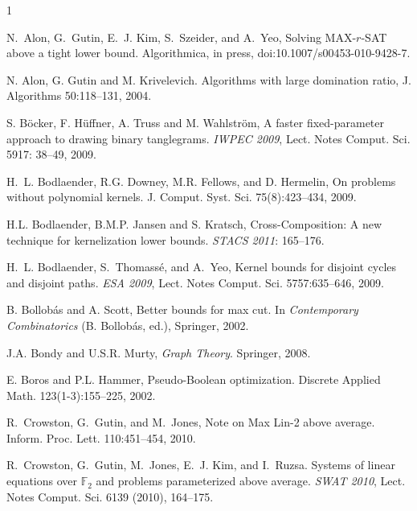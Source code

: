 \documentclass{llncs}
\begin{document}


%

\begin{thebibliography}{1}


N.~Alon, G.~Gutin, E.~J. Kim, S.~Szeider, and A.~Yeo,
Solving {MAX}-$r$-{SAT} above a tight lower bound.
Algorithmica, in press, doi:10.1007/s00453-010-9428-7.

 N. Alon, G. Gutin and M. Krivelevich. Algorithms with large
domination ratio, J. Algorithms 50:118--131, 2004.



 S. B{\"o}cker, F. H{\"u}ffner, A. Truss and M. Wahlstr{\"o}m, A faster fixed-parameter approach
to drawing binary tanglegrams. {\em IWPEC 2009}, Lect. Notes Comput. Sci. 5917: 38--49, 2009.

 H.~L. Bodlaender, R.G. Downey, M.R. Fellows,  and D. Hermelin,
On problems without polynomial kernels. J. Comput. Syst. Sci. 75(8):423--434, 2009.

 H.L. Bodlaender, B.M.P. Jansen and S. Kratsch, Cross-Composition:
A new technique for kernelization lower bounds. {\em STACS 2011}: 165--176.


H.~L. Bodlaender, S.~Thomass{\'e}, and A.~Yeo,
Kernel bounds for disjoint cycles and disjoint paths.
{\em ESA 2009}, Lect. Notes
Comput. Sci. 5757:635--646, 2009.

 B. Bollob{\'a}s and A. Scott, Better bounds for max cut.
In {\em Contemporary Combinatorics} (B. Bollob{\'a}s, ed.), Springer, 2002.

 J.A. Bondy and U.S.R. Murty, {\em Graph Theory}. Springer, 2008.


 E. Boros and P.L. Hammer, Pseudo-Boolean optimization.
Discrete Applied Math. 123(1-3):155--225, 2002.

R.~Crowston, G.~Gutin, and M.~Jones,
Note on {M}ax {L}in-2 above average.
Inform. Proc. Lett.  110:451--454, 2010.

R.~Crowston, G.~Gutin, M.~Jones, E.~J. Kim, and I.~Ruzsa.
Systems of linear equations over $\mathbb{F}_2$ and problems
parameterized above average. {\em SWAT 2010}, Lect. Notes
Comput. Sci. 6139 (2010),  164--175.


\end{thebibliography}
\end{document}
